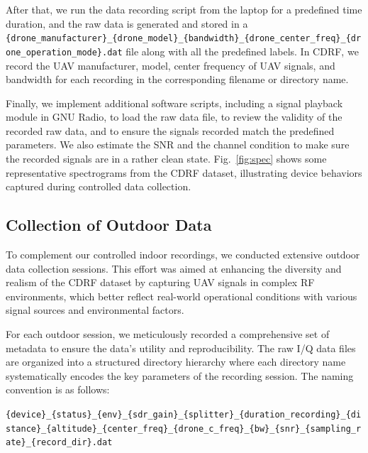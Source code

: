 After that, we run the data recording script from the laptop for a predefined time duration, and the raw data is generated and stored in a \texttt{\{drone\_\allowbreak manufacturer\}\_\allowbreak\{drone\_\allowbreak model\}\_\allowbreak \{bandwidth\}\_\allowbreak\{drone\_\allowbreak center\_\allowbreak freq\}\allowbreak\_\allowbreak\{drone\_\allowbreak operation\_\allowbreak mode\}.dat} file along with all the predefined labels. In CDRF, we record the UAV manufacturer, model, center frequency of UAV signals, and bandwidth for each recording in the corresponding filename or directory name. 

Finally, we implement additional software scripts, including a signal playback module in GNU Radio, to load the raw data file, to review the validity of the recorded raw data, and to ensure the signals recorded match the predefined parameters. We also estimate the SNR and the channel condition to make sure the recorded signals are in a rather clean state. Fig.~\ref{fig:spec} shows some representative spectrograms from the CDRF dataset, illustrating device behaviors captured during controlled data collection. 


\subsection{Collection of Outdoor Data}

To complement our controlled indoor recordings, we conducted extensive outdoor data collection sessions. This effort was aimed at enhancing the diversity and realism of the CDRF dataset by capturing UAV signals in complex RF environments, which better reflect real-world operational conditions with various signal sources and environmental factors.

For each outdoor session, we meticulously recorded a comprehensive set of metadata to ensure the data's utility and reproducibility. The raw I/Q data files are organized into a structured directory hierarchy where each directory name systematically encodes the key parameters of the recording session. The naming convention is as follows:

\texttt{\{device\}\_\allowbreak\{status\}\_\allowbreak\{env\}\_\allowbreak\{sdr\_gain\}\_\allowbreak\{splitter\}\_\allowbreak\{duration\_recording\}\_\allowbreak\{distance\}\_\allowbreak\{altitude\}\_\allowbreak\{center\_freq\}\_\allowbreak\{drone\_c\_freq\}\_\allowbreak\{bw\}\_\allowbreak\{snr\}\_\allowbreak\{sampling\_rate\}\_\allowbreak\{record\_dir\}.dat}

